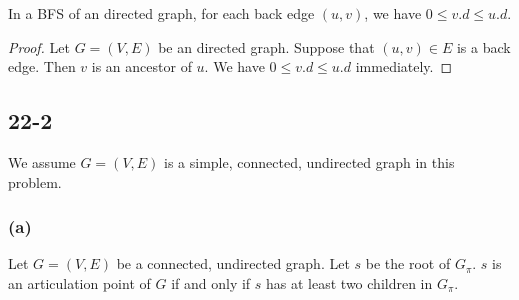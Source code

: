 \begin{claim}
    In a BFS of an directed graph,
    for each back edge $(u,v)$, we have $0 \leq v.d \leq u.d$.
\end{claim}

\begin{proof}
    Let $G = (V,E)$ be an directed graph.
    Suppose that $(u,v) \in E$ is a back edge.
    Then $v$ is an ancestor of $u$.
    We have $0 \leq v.d \leq u.d$ immediately.
\end{proof}

\subsection*{22-2}

We assume $G = (V,E)$ is a simple, connected, undirected graph
in this problem.

\subsubsection*{(a)}

\begin{claim}
    Let $G = (V,E)$ be a connected, undirected graph.
    Let $s$ be the root of $G_\pi$.
    $s$ is an articulation point of $G$ if and only if
    $s$ has at least two children in $G_\pi$.
\end{claim}

